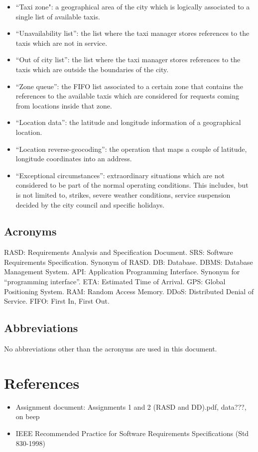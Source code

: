 \begin{itemize}
\item “Taxi zone": a geographical area of the city which is logically associated to a single list of available taxis. 
\item “Unavailability list”: the list where the taxi manager stores references to the taxis which are not in service.
\item “Out of city list”: the list where the taxi manager stores references to the taxis which are outside the boundaries of the city. 
\item “Zone queue”: the FIFO list associated to a certain zone that contains the references to the available taxis which are considered for requests coming from locations inside that zone. 
\item “Location data”: the latitude and longitude information of a geographical location.
\item “Location reverse-geocoding”: the operation that maps a couple of latitude, longitude coordinates into an address. 
\item “Exceptional circumstances”: extraordinary situations which are not considered to be part of the normal operating conditions. This includes, but is not limited to, strikes, severe weather conditions, service suspension decided by the city council and specific holidays.
\end{itemize}


\subsection{Acronyms}
RASD: Requirements Analysis and Specification Document.
SRS: Software Requirements Specification. Synonym of RASD.
DB: Database.
DBMS: Database Management System.
API: Application Programming Interface. Synonym for “programming interface”.
ETA: Estimated Time of Arrival.
GPS: Global Positioning System.
RAM: Random Access Memory.
DDoS: Distributed Denial of Service.
FIFO: First In, First Out.


\subsection{Abbreviations}
No abbreviations other than the acronyms are used in this document.


\section{References}
\begin{itemize}
\item Assignment document: Assignments 1 and 2 (RASD and DD).pdf, data???, on beep
\item IEEE Recommended Practice for Software Requirements Specifications (Std 830-1998)
\end{itemize}



